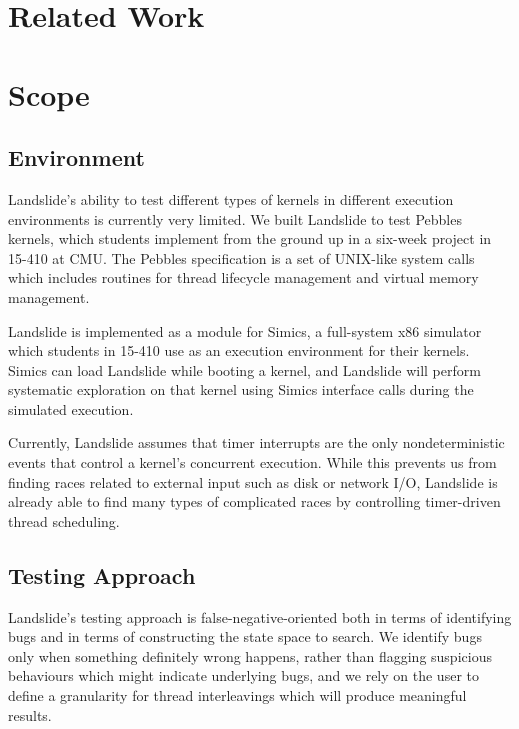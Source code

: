 \documentclass{llncs}
\begin{document}
\section{Related Work}

\section{Scope}
\subsection{Environment}
\label{sec:environment}

Landslide's ability to test different types of kernels in different execution environments is currently very limited.
We built Landslide to test Pebbles kernels, which students implement from the ground up in a six-week project in 15-410 at CMU. The Pebbles specification is a set of UNIX-like system calls which includes routines for thread lifecycle management and virtual memory management.

Landslide is implemented as a module for Simics, a full-system x86 simulator which students in 15-410 use as an execution environment for their kernels. Simics can load Landslide while booting a kernel, and Landslide will perform systematic exploration on that kernel using Simics interface calls during the simulated execution.

Currently, Landslide assumes that timer interrupts are the only nondeterministic events that control a kernel's concurrent execution. While this prevents us from finding races related to external input such as disk or network I/O, Landslide is already able to find many types of complicated races by controlling timer-driven thread scheduling.

\subsection{Testing Approach}
\label{sec:approach}

Landslide's testing approach is false-negative-oriented both in terms of identifying bugs and in terms of constructing the state space to search. 
We identify bugs only when something definitely wrong happens, rather than flagging suspicious behaviours which might indicate underlying bugs, and we rely on the user to define a granularity for thread interleavings which will produce meaningful results.
\end{document}
